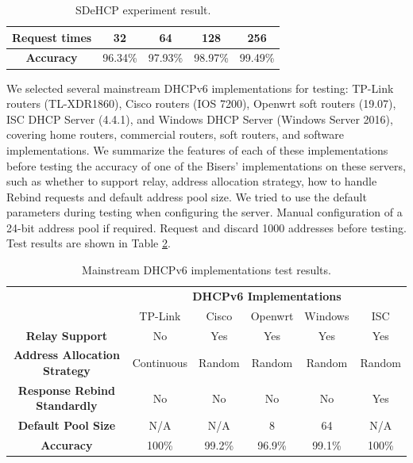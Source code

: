 \documentclass[conference]{IEEEtran}
\begin{document}
\begin{table}[htbp]
  \caption{SDeHCP experiment result.}
  \begin{center}
    \begin{tabular}{|c|c|c|c|c|}
      \hline
      \textbf{Request times} & 32 & 64 & 128 & 256 \\
      \hline
      \textbf{Accuracy} & 96.34\% & 97.93\% & 98.97\% & 99.49\% \\
      \hline
    \end{tabular}
    \label{tabSDeHCP}
  \end{center}
\end{table}

We selected several mainstream DHCPv6 implementations for testing:
TP-Link routers (TL-XDR1860), Cisco routers (IOS 7200), Openwrt soft
routers (19.07), ISC DHCP Server (4.4.1), and Windows DHCP Server
(Windows Server 2016), covering home routers, commercial routers, soft
routers, and software implementations. We summarize the features of
each of these implementations before testing the accuracy of one of
the Bisers' implementations on these servers, such as whether to
support relay, address allocation strategy, how to handle Rebind
requests and default address pool size. We tried to use the default
parameters during testing when configuring the server. Manual
configuration of a 24-bit address pool if required. Request and
discard 1000 addresses before testing. Test results are shown in Table
\ref{tabDHCPv6Server}.

\begin{table}[b]
  \caption{Mainstream DHCPv6 implementations test results.}
  \begin{center}
    \begin{tabular}{|c|c|c|c|c|c|}
      \hline
      & \multicolumn{5}{|c|}{\textbf{DHCPv6 Implementations}} \\
      \cline{2-6}
      & TP-Link & Cisco & Openwrt & Windows & ISC \\
      \hline
      \textbf{Relay Support} & No & Yes & Yes & Yes & Yes \\
      \textbf{Address Allocation Strategy} & Continuous & Random & Random & Random & Random \\
      \textbf{Response Rebind Standardly} & No & No & No & No & Yes \\
      \textbf{Default Pool Size} & N/A & N/A & 8 & 64 & N/A \\
      \textbf{Accuracy} & 100\% & 99.2\% & 96.9\% & 99.1\% & 100\% \\
      \hline
    \end{tabular}
    \label{tabDHCPv6Server}
  \end{center}
\end{table}
\end{document}
